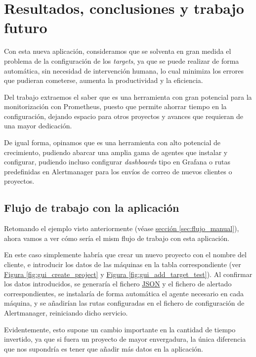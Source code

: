 \chapter{Resultados, conclusiones y trabajo futuro}

Con esta nueva aplicación, consideramos que se solventa en gran medida el problema de la configuración de los	\textit{targets}, ya que se puede realizar de forma automática, sin necesidad de intervención humana, lo cual minimiza los errores que pudieran cometerse, aumenta la productividad y la eficiencia.

Del trabajo extraemos el saber que es una herramienta con gran potencial para la monitorización con Prometheus, puesto que permite ahorrar tiempo en la configuración, dejando espacio para otros proyectos y avances que requieran de una mayor dedicación.

De igual forma, opinamos que es una herramienta con alto potencial de crecimiento, pudiendo abarcar una amplia gama de agentes que instalar y configurar, pudiendo incluso configurar \textit{dashboards} tipo en Grafana o rutas predefinidas en Alertmanager para los envíos de correo de nuevos clientes o proyectos.

\section*{Flujo de trabajo con la aplicación}

Retomando el ejemplo visto anteriormente (véase \hyperref[sec:flujo_manual]{sección \ref{sec:flujo_manual}}), ahora vamos a ver cómo sería el mism flujo de trabajo con esta aplicación.

En este caso simplemente habría que crear un nuevo proyecto con el nombre del cliente, e introducir los datos de las máquinas en la tabla correspondiente (ver \hyperref[fig:gui_create_project]{Figura \ref{fig:gui_create_project}} y \hyperref[fig:gui_add_target_test]{Figura \ref{fig:gui_add_target_test}}). Al confirmar los datos introducidos, se generaría el fichero \url{JSON} y el fichero de alertado correspondientes, se instalaría de forma automática el agente necesario en cada máquina, y se añadirían las rutas configuradas en el fichero de configuración de Alertmanager, reiniciando dicho servicio.

Evidentemente, esto supone un cambio importante en la cantidad de tiempo invertido, ya que si fuera un proyecto de mayor envergadura, la única diferencia que nos supondría es tener que añadir más datos en la aplicación.

